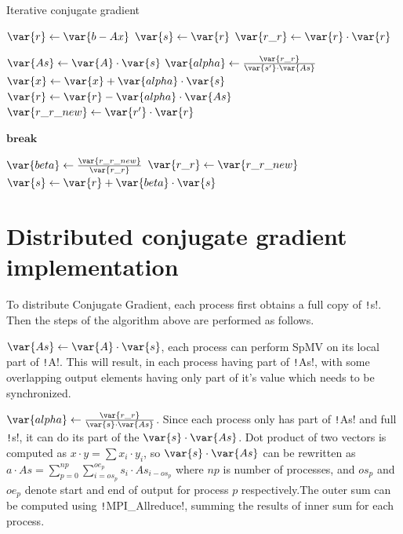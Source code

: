 \documentclass[thesis=M,english]{FITthesis}[2019/12/23]
\newcommand{\csre}[1]{\texttt!#1!}
\begin{document}
\begin{algorithm}
    \caption{Iterative conjugate gradient}\label{app:cg:algo}
    \begin{algorithmic}
        \State $\var{r} \gets \var{b - Ax}$
        \State $\var{s} \gets \var{r}$
        \State $\var{r\_r} \gets \var{r} \cdot \var{r}$

        \State $\var{As} \gets \var{A} \cdot \var{s}$
        \State $\var{alpha} \gets \frac{\var{r\_r}}{\var{s'} \cdot \var{As}} $
        \State $\var{x} \gets \var{x} + \var{alpha} \cdot \var{s}$
        \State $\var{r} \gets \var{r} - \var{alpha} \cdot \var{As}$
        \State $\var{r\_r\_new} \gets \var{r'} \cdot \var{r}$

        \State $\textbf{break}$
        \EndIf

        \State $\var{beta} \gets \frac{\var{r\_r\_new}}{\var{r\_r}}$
        \State $\var{r\_r} \gets \var{r\_r\_new}$
        \State $\var{s} \gets \var{r} + \var{beta} \cdot \var{s}$

        \EndFor

        \EndFunction
    \end{algorithmic}
\end{algorithm}

\section{Distributed conjugate gradient implementation}

To distribute Conjugate Gradient, each process first obtains a full copy of \csre{s}.
Then the steps of the algorithm above are performed as follows.

$\var{As} \gets \var{A} \cdot \var{s}$, each process can perform SpMV on its local part of
\csre{A}. This will result, in each process having part of \csre{As}, with some overlapping
output elements having only part of it's value which needs to be synchronized.

$\var{alpha} \gets \frac{\var{r\_r}}{\var{s} \cdot \var{As}}$. Since each process only has part of
\csre{As} and full \csre{s}, it can do its part of the $\var{s} \cdot \var{As}$.
Dot product of two vectors is computed as $x \cdot y = \sum x_i \cdot y_i$, so $\var{s} \cdot \var{As}$
can be rewritten as $a \cdot As = \sum_{p=0}^{np} \sum_{i=os_p}^{oe_p} s_i \cdot As_{i-os_p}$ where
$np$ is number of processes, and $os_p$ and $oe_p$ denote start and end of output for process
$p$ respectively.The outer sum can be computed using \csre{MPI_Allreduce},
summing the results of inner sum for each process.
\end{document}

